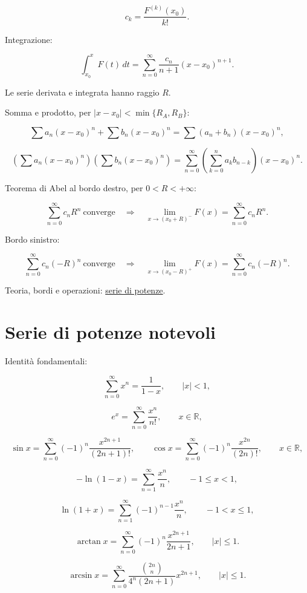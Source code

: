 \[
\displaystyle
c_k=\frac{F^{(k)}(x_0)}{k!}.
\]

Integrazione:

\[
\displaystyle
\int_{x_0}^{x}F(t)\,dt
=
\sum_{n=0}^{\infty}
\frac{c_n}{n+1}(x-x_0)^{n+1}.
\]

Le serie derivata e integrata hanno raggio \(R\).

Somma e prodotto, per \(\lvert x-x_0\rvert<\min\{R_A,R_B\}\):

\[
\displaystyle
\sum a_n(x-x_0)^n+\sum b_n(x-x_0)^n
=
\sum(a_n+b_n)(x-x_0)^n,
\]

\[
\displaystyle
\left(\sum a_n(x-x_0)^n\right)
\left(\sum b_n(x-x_0)^n\right)
=
\sum_{n=0}^{\infty}
\left(\sum_{k=0}^{n}a_kb_{n-k}\right)
(x-x_0)^n.
\]

Teorema di Abel al bordo destro, per \(0<R<+\infty\):

\[
\displaystyle
\sum_{n=0}^{\infty}c_nR^n\ \text{converge}
\quad\Longrightarrow\quad
\lim_{x\to(x_0+R)^-}F(x)
=
\sum_{n=0}^{\infty}c_nR^n.
\]

Bordo sinistro:

\[
\displaystyle
\sum_{n=0}^{\infty}c_n(-R)^n\ \text{converge}
\quad\Longrightarrow\quad
\lim_{x\to(x_0-R)^+}F(x)
=
\sum_{n=0}^{\infty}c_n(-R)^n.
\]

Teoria, bordi e operazioni: \href{https://ingegnerismo.it/matematica/serie-di-potenze/}{serie di potenze}.

\section{Serie di potenze notevoli}\label{serie-di-potenze-notevoli}

Identità fondamentali:

\[
\sum_{n=0}^{\infty}x^n=\frac1{1-x},
\qquad |x|<1,
\]

\[
e^x=\sum_{n=0}^{\infty}\frac{x^n}{n!},
\qquad x\in\mathbb R,
\]

\[
\sin x=\sum_{n=0}^{\infty}(-1)^n\frac{x^{2n+1}}{(2n+1)!},
\qquad
\cos x=\sum_{n=0}^{\infty}(-1)^n\frac{x^{2n}}{(2n)!},
\qquad x\in\mathbb R,
\]

\[
-\ln(1-x)=\sum_{n=1}^{\infty}\frac{x^n}{n},
\qquad -1\le x<1,
\]

\[
\ln(1+x)=\sum_{n=1}^{\infty}(-1)^{n-1}\frac{x^n}{n},
\qquad -1<x\le1,
\]

\[
\arctan x=\sum_{n=0}^{\infty}(-1)^n\frac{x^{2n+1}}{2n+1},
\qquad |x|\le1.
\]

\[
\arcsin x
=\sum_{n=0}^{\infty}
\frac{\binom{2n}{n}}{4^n(2n+1)}x^{2n+1},
\qquad |x|\le1.
\]


